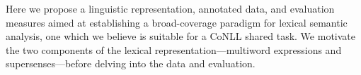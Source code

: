 \documentclass[11pt]{article}
\newcommand{\ensuretext}[1]{#1}
\newcommand{\nssmarker}{\ensuretext{\textcolor{magenta}{\ensuremath{^{\textsc{NS}}_{\textsc{S}}}}}}
\newcommand{\arkcomment}[3]{\ensuretext{\textcolor{#3}{[#1 #2]}}}
\newcommand{\nss}[1]{\arkcomment{\nssmarker}{#1}{magenta}}
\begin{document}
Here we propose a linguistic representation, annotated data, and evaluation measures 
aimed at establishing a broad-coverage paradigm for lexical semantic analysis, 
one which we believe is suitable for a CoNLL shared task. 
We motivate the two components of the lexical representation---multiword expressions 
and supersenses---before delving into the data and evaluation.

\end{document}
